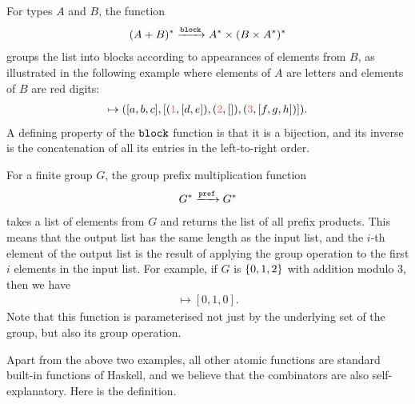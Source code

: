 \begin{myexample}[Block]\label{ex:block}
    For types $A$ and $B$, the function 
    \begin{align*}
    (A + B)^* \xrightarrow{\mathtt{block}} A^* \times (B \times A^*)^*
    \end{align*}
    groups the list into blocks according to appearances of elements from $B$, as illustrated in the following example where elements of $A$ are letters and elements of $B$ are red digits:
    \begin{align*}
    [a,b,c,\red 1,d,e,\red 2,\red 3,f,g,h] \mapsto ([a,b,c],[(\red 1,[d,e]),(\red 2,[]), (\red 3,[f,g,h])]).
    \end{align*}
    A defining property of the $\mathtt{block}$ function is that it is a bijection, and its inverse is the concatenation of all its entries in the left-to-right order. 
\end{myexample}

\begin{myexample}
    For a finite group $G$, the group prefix multiplication function 
    \begin{align*}
    G^* \xrightarrow{\mathtt{pref}} G^*
    \end{align*}
    takes a list of elements from $G$ and returns the list of all prefix products. This means that the output list has the same length as the input list, and the $i$-th element of the output list is the result of applying the group operation  to the first $i$ elements in the input list. For example, if $G$ is $\{0,1,2\}$ with addition modulo 3, then we have
    \begin{align*}
    [0,1,2] \mapsto [0,1,0].
    \end{align*}
    Note that this function is parameterised not just by the underlying set of the group, but also its group operation. 
\end{myexample}

Apart from the above two examples, all other atomic functions are standard built-in functions of Haskell, and we believe that the combinators are also self-explanatory. Here is the definition.

